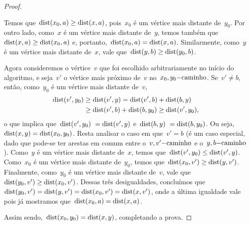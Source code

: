 \begin{proof}
			\begin{center}  \end{center}


			Temos que~${\mathrm{dist}(x_0,a)\ge \mathrm{dist}(x,a)}$,
			pois~$x_0$ é um vértice mais distante de~$y_0$.
			Por outro lado, como~$x$ é um vértice mais distante
			de~$y$, temos também que~${\mathrm{dist}(x,a)\ge \mathrm{dist}(x_0,a)}$
			e, portanto,~${\mathrm{dist}(x_0,a) =\mathrm{dist}(x,a)}$.
			Similarmente, como~$y$ é um vértice mais distante 
			de~$x$, vale que~${\mathrm{dist}(y,b) \ge \mathrm{dist}(y_0,b)}$.

			Agora consideremos o vértice~$v$ que foi escolhido 
			arbitrariamente no início do algoritmo, e seja~$v'$
			o vértice mais próximo de~$v$ no~$x_0,y_0\mathrm{-caminho}$.
			Se~$v'\ne b$, então, como~$y_0$ é um vértice mais 
			distante de~$v$,
			\begin{align}
				\mathrm{dist}(v',y_0) &\ge \mathrm{dist}(v',y) =\mathrm{dist}(v',b) + 
				\mathrm{dist}(b,y)\nonumber \\
				&\ge \mathrm{dist}(v',b) + \mathrm{dist}(b,y_0) \ge \mathrm{dist}(v',y_0) 
				\nonumber,
			\end{align} 
			o que implica que~${\mathrm{dist}(v',y_0)~=\mathrm{dist}(v',y)}$ 
			e~${\mathrm{dist}(b,y)~=\mathrm{dist}(b,y_0)}$. 
			Ou seja,~${\mathrm{dist}(x,y) =\mathrm{dist}(x_0,y_0)}$.
			Resta analisar o caso em que~$v'=b$ (é um caso 
			especial, dado que pode-se ter arestas em comum 
			entre o~$v,v'\mathrm{-caminho}$ e o~$y,b\mathrm{-caminho}$).
			Como~$y$ é um vértice mais distante de~$x$, temos 
			que~$\mathrm{dist}(v',y_0) \le \mathrm{dist}(v',y)$.
			Como~$x_0$ é um vértice mais distante de~$y_0$, temos
			que~$\mathrm{dist}(x_0,v') \ge \mathrm{dist}(y,v')$.
			Finalmente, como~$y_0$ é um vértice mais distante 
			de~$v$, vale que~$\mathrm{dist}(y_0,v')\ge \mathrm{dist}(x_0,v')$.
			Dessas três desigualdades, concluímos 
			que~${\mathrm{dist}(y_0,v')=\mathrm{dist}(y,v')=\mathrm{dist}(x_0,v')=\mathrm{dist}(x,v')}$,
			onde a última igualdade vale pois já mostramos 
			que~${\mathrm{dist}(x_0,a) =\mathrm{dist}(x,a)}$.

			Assim sendo,~${\mathrm{dist}(x_0,y_0) =\mathrm{dist}(x,y)}$, completando a 
			prova.
	\end{proof}

	\bigskip
	\bigskip



